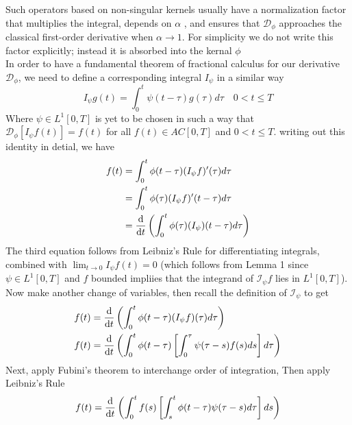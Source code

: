 \documentclass[twoside]{book}
\begin{document}
{Such operators based on non-singular kernels usually have a normalization factor that multiplies the integral, depends on $\alpha$ , and ensures that $\mathcal{D}_{\phi}$ approaches the classical first-order derivative when $\alpha \rightarrow 1$. For simplicity we do not write this factor explicitly; instead it is absorbed into the kernal $\phi$ \\
\newline
In order to have a fundamental theorem of fractional calculus for our derivative $\mathcal{D}_{\phi}$, we need to define a corresponding integral $I_\psi$ in a similar way
\begin{equation}
    I_\psi g(t) = \int_0^t \psi(t-\tau) g(\tau) d\tau \quad 0<t \leq T
\end{equation}
Where $\psi \in L^1[0,T]$ is yet to be chosen in such a way that $\mathcal{D}_{\phi}[I_\psi f(t)] = f(t)$ for all $f(t) \in AC[0,T]$ and $0<t\leq T$. writing out this identity in detial, we have
\begin{align*}
    f(t) & = \int_0^t \phi(t-\tau)(I_\psi f)'(\tau) d\tau                      \\
         & = \int_0^t \phi(\tau)(I_\psi f)'(t-\tau) d\tau                      \\
         & = \dv{}{t} \left( \int_0^t \phi(\tau)(I_\psi)(t-\tau) d\tau \right) \\
\end{align*}
The third equation follows from Leibniz's Rule for differentiating integrals, combined with $\lim_{t \to 0} I_{\psi} f(t) = 0$ (which follows from Lemma 1 since $\psi \in L^{1}[0,T]$ and $f$ bounded impliies that the integrand of $\mathscr{I}_{\psi}f$ lies in $L^{1}[0,T]$). Now make another change of variables, then recall the definition of $\mathscr{I}_{\psi}$ to get
\begin{align*}
    f(t) & = \dv{}{t} \left( \int_0^t \phi(t-\tau)(I_\psi f)(\tau) d\tau \right)                              \\
    f(t) & = \dv{}{t}\left( \int_0^t \phi(t-\tau)\left[ \int_0^\tau \psi(\tau-s)f(s) ds \right] d\tau \right) \\
\end{align*}
Next, apply Fubini's theorem to interchange order of integration, Then apply Leibniz's Rule\\
\begin{align*}
    f(t) & = \dv{}{t}\left( \int_0^t f(s)\left[ \int_s^t  \phi(t-\tau) \psi(\tau-s) d\tau \right] ds \right)                                                                 \\

\end{align*}}
\end{document}
